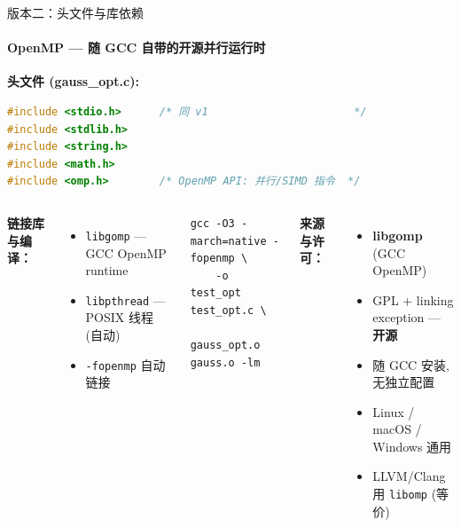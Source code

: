 \documentclass[12pt,aspectratio=169]{beamer}
\begin{document}
\begin{frame}[fragile]{版本二：头文件与库依赖}
\framesubtitle{OpenMP — 随 GCC 自带的开源并行运行时}

\textbf{头文件 (gauss\_opt.c):}
\begin{lstlisting}[language=C,basicstyle=\ttfamily\footnotesize,belowskip=-2pt,aboveskip=0pt,numbers=none]
#include <stdio.h>      /* 同 v1                       */
#include <stdlib.h>
#include <string.h>
#include <math.h>
#include <omp.h>        /* OpenMP API: 并行/SIMD 指令  */
\end{lstlisting}

\vspace{4pt}
\footnotesize
\begin{columns}[T]
\textbf{链接库与编译：}
\begin{itemize}\itemsep0pt
  \item \texttt{libgomp} — GCC OpenMP runtime
  \item \texttt{libpthread} — POSIX 线程 (自动)
  \item \texttt{-fopenmp} 自动链接
\end{itemize}
\begin{lstlisting}[basicstyle=\ttfamily\scriptsize,belowskip=-2pt,aboveskip=0pt,numbers=none]
gcc -O3 -march=native -fopenmp \
    -o test_opt test_opt.c \
    gauss_opt.o gauss.o -lm
\end{lstlisting}

\textbf{来源与许可：}
\begin{itemize}\itemsep0pt
  \item \textbf{libgomp} (GCC OpenMP)
  \item GPL + linking exception — \textbf{开源}
  \item 随 GCC 安装, 无独立配置
  \item Linux / macOS / Windows 通用
  \item LLVM/Clang 用 \texttt{libomp} (等价)
\end{itemize}
\end{columns}
\end{frame}
\end{document}
